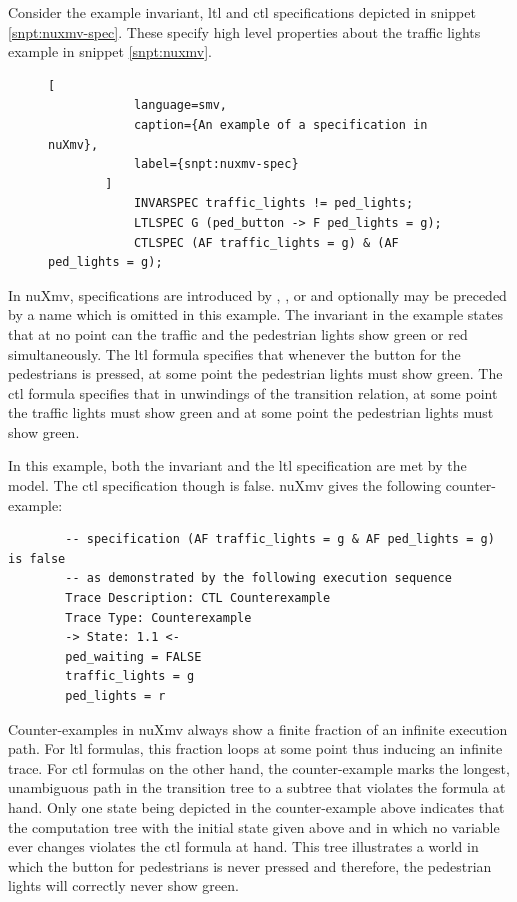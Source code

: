 \begin{example}
    Consider the example invariant, \gls{ltl} and \gls{ctl} specifications depicted in snippet \ref{snpt:nuxmv-spec}.
    These specify high level properties about the traffic lights example in snippet \ref{snpt:nuxmv}.

    \begin{figure}
        \begin{lstlisting}[
            language=smv,
            caption={An example of a specification in nuXmv},
            label={snpt:nuxmv-spec}
        ]
            INVARSPEC traffic_lights != ped_lights;
            LTLSPEC G (ped_button -> F ped_lights = g);
            CTLSPEC (AF traffic_lights = g) & (AF ped_lights = g);
        \end{lstlisting}
    \end{figure}


    In nuXmv, specifications are introduced by , , or  and optionally may be preceded by a name which is omitted in this example.
    The invariant in the example states that at no point can the traffic and the pedestrian lights show green or red simultaneously.
    The \gls{ltl} formula specifies that whenever the button for the pedestrians is pressed, at some point the pedestrian lights must show green.
    The \gls{ctl} formula specifies that in unwindings of the transition relation, at some point the traffic lights must show green and at some point the pedestrian lights must show green.

    In this example, both the invariant and the \gls{ltl} specification are met by the model.
    The \gls{ctl} specification though is false.
    nuXmv gives the following counter-example:

    \begin{lstlisting}
        -- specification (AF traffic_lights = g & AF ped_lights = g)  is false
        -- as demonstrated by the following execution sequence
        Trace Description: CTL Counterexample
        Trace Type: Counterexample
        -> State: 1.1 <-
        ped_waiting = FALSE
        traffic_lights = g
        ped_lights = r
    \end{lstlisting}

    Counter-examples in nuXmv always show a finite fraction of an infinite execution path.
    For \gls{ltl} formulas, this fraction loops at some point thus inducing an infinite trace.
    For \gls{ctl} formulas on the other hand, the counter-example marks the longest, unambiguous path in the transition tree to a subtree that violates the formula at hand.
    Only one state being depicted in the counter-example above indicates that the computation tree with the initial state given above and in which no variable ever changes violates the \gls{ctl} formula at hand.
    This tree illustrates a world in which the button for pedestrians is never pressed and therefore, the pedestrian lights will correctly never show green.


\end{example}
